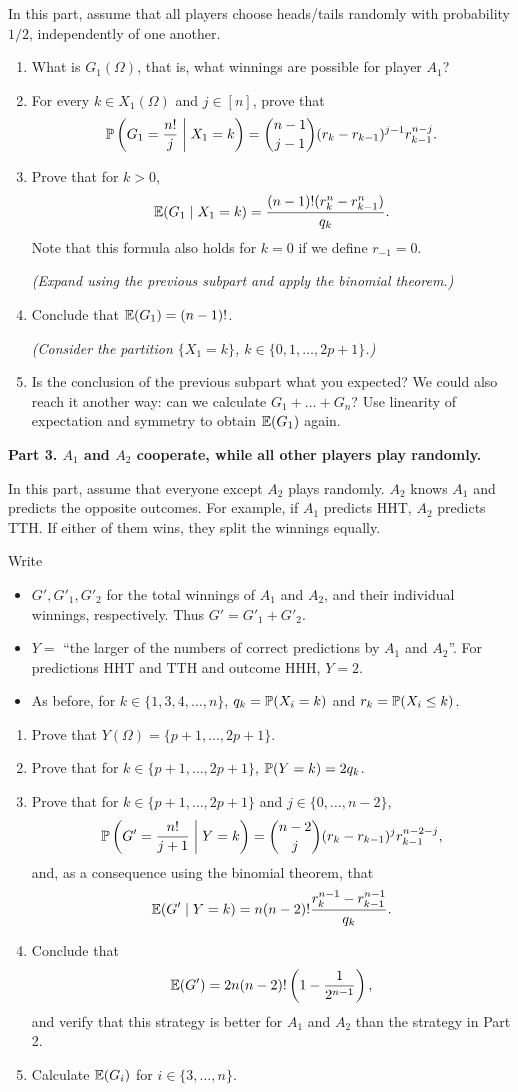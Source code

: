 \documentclass[a4paper]{report}
\begin{document}
\begin{problem}
In this part, assume that all players choose heads/tails randomly with probability $1/2$, independently of one another.
\begin{enumerate}
\item What is $G_1(\Omega)$, that is, what winnings are possible for player $A_1$?
\item For every $k\in X_1(\Omega)$ and $j\in[n]$, prove that
\[\P\left(G_1=\frac{n!}{j}\;\middle\vert\;X_1=k\right)
=\binom{n-1}{j-1}(r_k-r_{k-1})^{j-1}r_{k-1}^{n-j}.\]
\item Prove that for $k>0$,
\[\E(G_1\mid X_1=k)=\frac{(n-1)!(r_k^n-r_{k-1}^n)}{q_k}.\]
Note that this formula also holds for $k=0$ if we define $r_{-1}=0$.

\textit{(Expand using the previous subpart and apply the binomial theorem.)}
\item Conclude that $\E(G_1)=(n-1)!$.

\textit{(Consider the partition $\{X_1=k\}$, $k\in\{0,1,\dots,2p+1\}$.)}
\item Is the conclusion of the previous subpart what you expected? We could also reach it another way: can we calculate $G_1+\dots+G_n$? Use linearity of expectation and symmetry to obtain $\E(G_1)$ again.
\end{enumerate}
\textbf{Part 3. $A_1$ and $A_2$ cooperate, while all other players play randomly.}

In this part, assume that everyone except $A_2$ plays randomly. $A_2$ knows $A_1$ and predicts the opposite outcomes. For example, if $A_1$ predicts HHT, $A_2$ predicts TTH. If either of them wins, they split the winnings equally.

Write
\begin{itemize}
\item $G',G'_1,G'_2$ for the total winnings of $A_1$ and $A_2$, and their individual winnings, respectively. Thus $G'=G'_1+G'_2$.
\item $Y=$ ``the larger of the numbers of correct predictions by $A_1$ and $A_2$''. For predictions HHT and TTH and outcome HHH, $Y=2$.
\item As before, for $k\in\{1,3,4,\dots,n\}$, $q_k=\P(X_i=k)$ and $r_k=\P(X_i\leq k)$.
\end{itemize}
\begin{enumerate}
\item Prove that $Y(\Omega)=\{p+1,\dots,2p+1\}$.
\item Prove that for $k\in\{p+1,\dots,2p+1\}$, $\P(Y=k)=2q_k$.
\item Prove that for $k\in\{p+1,\dots,2p+1\}$ and $j\in\{0,\dots,n-2\}$,
\[\P\left(G'=\frac{n!}{j+1}\;\middle\vert\;Y=k\right)
=\binom{n-2}{j}(r_k-r_{k-1})^j r_{k-1}^{n-2-j},\]
and, as a consequence using the binomial theorem, that
\[\E(G'\mid Y=k)=n(n-2)!\frac{r_k^{n-1}-r_{k-1}^{n-1}}{q_k}.\]
\item Conclude that
\[\E(G')=2n(n-2)!\left(1-\frac1{2^{n-1}}\right),\]
and verify that this strategy is better for $A_1$ and $A_2$ than the strategy in Part 2.
\item Calculate $\E(G_i)$ for $i\in\{3,\dots,n\}$.
\end{enumerate}
\end{problem}
\end{document}
